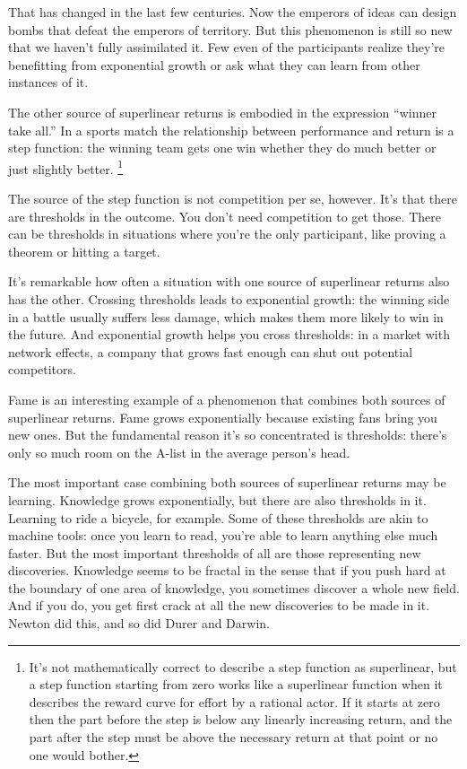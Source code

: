 That has changed in the last few centuries. Now the emperors of ideas
can design bombs that defeat the emperors of territory. But this
phenomenon is still so new that we haven't fully assimilated it. Few
even of the participants realize they're benefitting from exponential
growth or ask what they can learn from other instances of it.

The other source of superlinear returns is embodied in the expression
``winner take all.'' In a sports match the relationship between
performance and return is a step function: the winning team gets one win
whether they do much better or just slightly better.
\footnote{It's not mathematically correct to describe a step function as
superlinear, but a step function starting from zero works like a
superlinear function when it describes the reward curve for effort by a
rational actor. If it starts at zero then the part before the step is
below any linearly increasing return, and the part after the step must
be above the necessary return at that point or no one would bother.}

The source of the step function is not competition per se, however. It's
that there are thresholds in the outcome. You don't need competition to
get those. There can be thresholds in situations where you're the only
participant, like proving a theorem or hitting a target.

It's remarkable how often a situation with one source of superlinear
returns also has the other. Crossing thresholds leads to exponential
growth: the winning side in a battle usually suffers less damage, which
makes them more likely to win in the future. And exponential growth
helps you cross thresholds: in a market with network effects, a company
that grows fast enough can shut out potential competitors.

Fame is an interesting example of a phenomenon that combines both
sources of superlinear returns. Fame grows exponentially because
existing fans bring you new ones. But the fundamental reason it's so
concentrated is thresholds: there's only so much room on the A-list in
the average person's head.

The most important case combining both sources of superlinear returns
may be learning. Knowledge grows exponentially, but there are also
thresholds in it. Learning to ride a bicycle, for example. Some of these
thresholds are akin to machine tools: once you learn to read, you're
able to learn anything else much faster. But the most important
thresholds of all are those representing new discoveries. Knowledge
seems to be fractal in the sense that if you push hard at the boundary
of one area of knowledge, you sometimes discover a whole new field. And
if you do, you get first crack at all the new discoveries to be made in
it. Newton did this, and so did Durer and Darwin.


